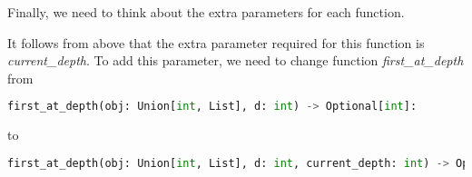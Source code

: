 \documentclass[12pt]{article}
\begin{document}
\begin{enumerate}[a.]
\begin{mdframed}
\begin{mdframed}
\begin{mdframed}
        \end{mdframed}

        \bigskip

        Finally, we need to think about the extra parameters for each function.

        \bigskip

        It follows from above that the extra parameter required for this function is
        \textit{current\_depth}. To add this parameter, we need to change function
        \textit{first\_at\_depth} from

        \begin{lstlisting}[language=python,keepspaces=false]
        first_at_depth(obj: Union[int, List], d: int) -> Optional[int]:
        \end{lstlisting}

        to

        \begin{lstlisting}[language=python,keepspaces=false]
        first_at_depth(obj: Union[int, List], d: int, current_depth: int) -> Optional[int]:
        \end{lstlisting}

        \end{mdframed}
    \end{mdframed}

\end{enumerate}
\end{document}
